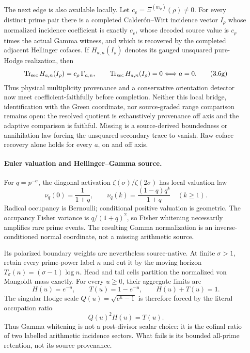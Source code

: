 \documentclass[11pt]{article}
\theoremstyle{definition}
\theoremstyle{remark}
\begin{document}
The next edge is also available locally.  Let
\(c_\rho=\Xi^{(m_\rho)}(\rho)\ne0\).  For every distinct prime pair there is
a completed Calder\'on--Witt incidence vector \(I_\rho\) whose normalized
incidence coefficient is exactly \(c_\rho\), whose decoded source value is
\(c_\rho\) times the actual Gamma witness, and which is recovered by the
completed adjacent Hellinger cofaces.  If \(H_{a,n}(I_\rho)\) denotes its
gauged unsquared pure-Hodge realization, then
\[
 \operatorname{Tr}_{\rm sec}H_{a,n}(I_\rho)
     =c_\rho\,\Gamma_{a,n},
 \qquad
 \operatorname{Tr}_{\rm sec}H_{a,n}(I_\rho)=0
     \Longleftrightarrow a=0.
\tag{3.6g}\label{eq:theta-hodge-detector}
\]
Thus physical multiplicity provenance and a conservative orientation
detector now meet coefficient-faithfully before completion.  Neither this
local bridge, identification with the Green coordinate, nor source-graded
range comparison remains open: the resolved quotient is exhaustively
provenance off axis and the adaptive comparison is faithful.  Missing is a
source-derived boundedness or annihilation law forcing the unsquared
secondary trace to vanish.  Raw coface recovery alone holds for every
\(a\), on and off axis.

\paragraph{Euler valuation and Hellinger--Gamma source.}
For \(q=p^{-\sigma}\), the diagonal activation
\(\zeta(\sigma)/\zeta(2\sigma)\) has local valuation law
\[
 \nu_q(0)=\frac1{1+q},\qquad
 \nu_q(k)=\frac{(1-q)q^k}{1+q}\quad(k\ge1).
\tag{3.7}\label{eq:valuation}
\]
Radical occupancy is Bernoulli; conditional positive valuation is
geometric.  The occupancy Fisher variance is \(q/(1+q)^2\), so
Fisher whitening necessarily amplifies rare prime events.  The resulting
Gamma normalization is an inverse-conditioned normal coordinate, not a
missing arithmetic source.

Its polarized boundary weights are nevertheless source-native.  At finite
\(\sigma>1\), retain every prime-power label \(n\) and cut it by the moving
horizon \(T_\sigma(n)=(\sigma-1)\log n\).  Head and tail cells partition the
normalized von Mangoldt mass exactly.  For every \(u\ge0\), their aggregate
limits are
\[
       H(u)=e^{-u},\qquad T(u)=1-e^{-u},\qquad H(u)+T(u)=1.
\tag{3.7z}\label{eq:labeled-occupation-limit}
\]
The singular Hodge scale \(Q(u)=\sqrt{e^u-1}\) is therefore forced by the
literal occupation ratio
\[
                         Q(u)^2H(u)=T(u).
\tag{3.7za}\label{eq:hodge-occupation-ratio}
\]
Thus Gamma whitening is not a post-divisor scalar choice: it is the cofinal
ratio of two labelled arithmetic incidence sectors.  What fails is its
bounded all-prime retention, not its source provenance.
\end{document}
